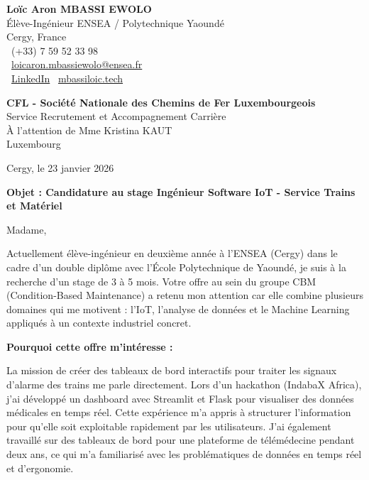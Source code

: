 \documentclass[a4paper,11pt]{article}
\begin{document}
\noindent
\textbf{Loïc Aron MBASSI EWOLO} \\
Élève-Ingénieur ENSEA / Polytechnique Yaoundé \\
Cergy, France \\
\faPhone\ (+33) 7 59 52 33 98 \\
\faEnvelope\ \href{mailto:loicaron.mbassiewolo@ensea.fr}{loicaron.mbassiewolo@ensea.fr} \\
\faLinkedin\ \href{https://www.linkedin.com/in/loic-aron-mbassi-ewolo-3942a9246/}{LinkedIn} \quad
\faGlobe\ \href{https://mbassiloic.tech}{mbassiloic.tech}

\vspace{0.6cm}

\noindent

\noindent
\textbf{CFL - Société Nationale des Chemins de Fer Luxembourgeois} \\
Service Recrutement et Accompagnement Carrière \\
À l'attention de Mme Kristina KAUT \\
Luxembourg

\vspace{0.4cm}

\hfill Cergy, le 23 janvier 2026

\vspace{0.4cm}

\noindent
\textbf{Objet : Candidature au stage Ingénieur Software IoT - Service Trains et Matériel}

\vspace{0.3cm}

\noindent
Madame,

\vspace{0.2cm}

Actuellement élève-ingénieur en deuxième année à l'ENSEA (Cergy) dans le cadre d'un double diplôme avec l'École Polytechnique de Yaoundé, je suis à la recherche d'un stage de 3 à 5 mois. Votre offre au sein du groupe CBM (Condition-Based Maintenance) a retenu mon attention car elle combine plusieurs domaines qui me motivent : l'IoT, l'analyse de données et le Machine Learning appliqués à un contexte industriel concret.

\vspace{0.3cm}

\textbf{Pourquoi cette offre m'intéresse :}

\vspace{0.2cm}

La mission de créer des tableaux de bord interactifs pour traiter les signaux d'alarme des trains me parle directement. Lors d'un hackathon (IndabaX Africa), j'ai développé un dashboard avec Streamlit et Flask pour visualiser des données médicales en temps réel. Cette expérience m'a appris à structurer l'information pour qu'elle soit exploitable rapidement par les utilisateurs. J'ai également travaillé sur des tableaux de bord pour une plateforme de télémédecine pendant deux ans, ce qui m'a familiarisé avec les problématiques de données en temps réel et d'ergonomie.
\end{document}
